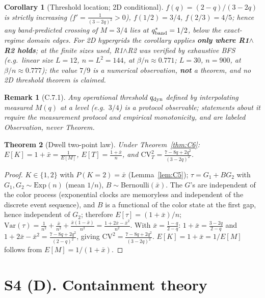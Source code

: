 \documentclass[preprint,12pt]{elsarticle}
\newtheorem{theorem}{Theorem}[section]
\newtheorem{corollary}[theorem]{Corollary}
\newtheorem{remark}{Remark}[theorem]
\begin{document}
\begin{corollary}[Threshold location; 2D conditional]
\label{cor:C7}
$f(q)=(2-q)/(3-2q)$ is strictly increasing
($f'=\frac{1}{(3-2q)^2}>0$), $f(1/2)=3/4$, $f(2/3)=4/5$; hence any
band-predicted crossing of $M=3/4$ lies at $q^\ast_{\rm band}=1/2$,
below the exact-regime domain edges. For 2D hypergrids the corollary applies \textbf{only where R1$\wedge$R2
holds}; at the finite sizes used, R1$\wedge$R2 was verified by exhaustive
BFS (e.g.\ linear size $L=12$, $n=L^2=144$, at $\beta/n\approx0.771$;
$L=30$, $n=900$, at $\beta/n\approx0.777$); the value $7/9$ is a
numerical observation, \textbf{not} a theorem, and no 2D threshold
theorem is claimed.
\end{corollary}
\begin{remark}[C.7.1]
\label{rem:C7.1}
Any operational threshold $q_{\rm dyn}$ defined by interpolating measured
$M(q)$ at a level (e.g.\ $3/4$) is a \emph{protocol observable};
statements about it require the measurement protocol and empirical
monotonicity, and are labeled Observation, never Theorem.
\end{remark}

\begin{theorem}[Dwell two-point law]
\label{thm:C8}
Under Theorem~\ref{thm:C6}: $E[K]=1+\bar x=\frac{1}{E[M]}$,
$E[T]=\frac{1+\bar x}{n}$, and
$\mathrm{CV}_T^2=\frac{7-8q+2q^2}{(3-2q)^2}$.
\end{theorem}
\begin{proof}
$K\in\{1,2\}$ with $P(K=2)=\bar x$ (Lemma~\ref{lem:C5});
$\tau=G_1+BG_2$ with $G_1,G_2\sim\mathrm{Exp}(n)$ (mean $1/n$),
$B\sim$Bernoulli$(\bar x)$. The $G$'s are independent of the color
process (exponential clocks are memoryless and independent of the
discrete event sequence), and $B$ is a functional of the color state at
the first gap, hence independent of $G_2$; therefore
$E[\tau]=(1+\bar x)/n$;
$\mathrm{Var}(\tau)=\frac1{n^2}+\frac{\bar x}{n^2}
+\frac{\bar x(1-\bar x)}{n^2}=\frac{1+2\bar x-\bar x^2}{n^2}$. With
$\bar x=\frac{1-q}{2-q}$: $1+\bar x=\frac{3-2q}{2-q}$ and
$1+2\bar x-\bar x^2=\frac{7-8q+2q^2}{(2-q)^2}$, giving
$\mathrm{CV}^2=\frac{7-8q+2q^2}{(3-2q)^2}$. $E[K]=1+\bar x=1/E[M]$
follows from $E[M]=1/(1+\bar x)$.
\end{proof}

\section{S4 (D). Containment theory}
\label{sec:D}
\end{document}
